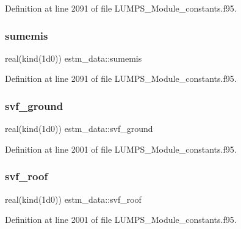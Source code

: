 Definition at line 2091 of file L\+U\+M\+P\+S\+\_\+\+Module\+\_\+constants.\+f95.

\mbox{\label{namespaceestm__data_ab6cbc4b326b1f0403459db52b8cf12dc}} 
\subsubsection{\texorpdfstring{sumemis}{sumemis}}
{\footnotesize\ttfamily real(kind(1d0)) estm\+\_\+data\+::sumemis}



Definition at line 2091 of file L\+U\+M\+P\+S\+\_\+\+Module\+\_\+constants.\+f95.

\mbox{\label{namespaceestm__data_afd27c2534f1d97d23367fc2b4203e4f7}} 
\subsubsection{\texorpdfstring{svf\+\_\+ground}{svf\_ground}}
{\footnotesize\ttfamily real(kind(1d0)) estm\+\_\+data\+::svf\+\_\+ground}



Definition at line 2001 of file L\+U\+M\+P\+S\+\_\+\+Module\+\_\+constants.\+f95.

\mbox{\label{namespaceestm__data_ae568b13ec9ad1aad863dfe2b54d4d695}} 
\subsubsection{\texorpdfstring{svf\+\_\+roof}{svf\_roof}}
{\footnotesize\ttfamily real(kind(1d0)) estm\+\_\+data\+::svf\+\_\+roof}



Definition at line 2001 of file L\+U\+M\+P\+S\+\_\+\+Module\+\_\+constants.\+f95.

\mbox{\label{namespaceestm__data_ac1d0eaab6bd3fd1a3a65ad825490f404}} 
